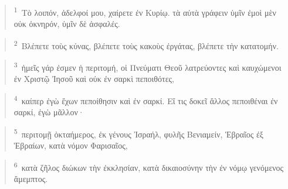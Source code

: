 \documentclass{article}
\newcommand{\currentverse}{1} %
\newcommand{\setcurrentverse}[1]{\renewcommand{\currentverse}{#1}}
\begin{document}
\begin{verse}

\setcurrentverse{1}

\setcounter{footnote}{0}

\textsuperscript{1}~Τὸ λοιπόν, ἀδελφοί μου, χαίρετε ἐν Κυρίῳ. τὰ αὐτὰ γράφειν ὑμῖν ἐμοὶ μὲν οὐκ ὀκνηρόν, ὑμῖν δὲ ἀσφαλές.

\end{verse}

\begin{verse}

\setcurrentverse{2}

\setcounter{footnote}{0}

\textsuperscript{2}~Βλέπετε τοὺς κύνας, βλέπετε τοὺς κακοὺς ἐργάτας, βλέπετε τὴν κατατομήν.

\end{verse}

\begin{verse}

\setcurrentverse{3}

\setcounter{footnote}{0}

\textsuperscript{3}~ἡμεῖς γάρ ἐσμεν ἡ περιτομή, οἱ Πνεύματι Θεοῦ λατρεύοντες καὶ καυχώμενοι ἐν Χριστῷ Ἰησοῦ καὶ οὐκ ἐν σαρκὶ πεποιθότες,

\end{verse}

\begin{verse}

\setcurrentverse{4}

\setcounter{footnote}{0}

\textsuperscript{4}~καίπερ ἐγὼ ἔχων πεποίθησιν καὶ ἐν σαρκί. Εἴ τις δοκεῖ ἄλλος πεποιθέναι ἐν σαρκί, ἐγὼ μᾶλλον·

\end{verse}

\begin{verse}

\setcurrentverse{5}

\setcounter{footnote}{0}

\textsuperscript{5}~περιτομῇ ὀκταήμερος, ἐκ γένους Ἰσραήλ, φυλῆς Βενιαμείν, Ἑβραῖος ἐξ Ἑβραίων, κατὰ νόμον Φαρισαῖος,

\end{verse}

\begin{verse}

\setcurrentverse{6}

\setcounter{footnote}{0}

\textsuperscript{6}~κατὰ ζῆλος διώκων τὴν ἐκκλησίαν, κατὰ δικαιοσύνην τὴν ἐν νόμῳ γενόμενος ἄμεμπτος.

\end{verse}
\end{document}
